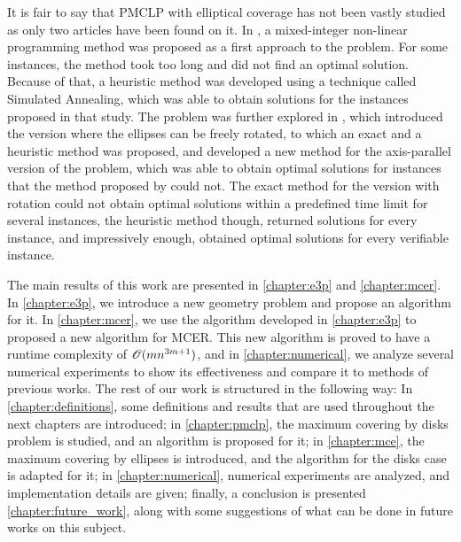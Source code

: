 It is fair to say that PMCLP with elliptical coverage has not been vastly studied as only two articles have been found on it. In , a mixed-integer non-linear programming method was proposed as a first approach to the problem. For some instances, the method took too long and did not find an optimal solution. Because of that, a heuristic method was developed using a technique called Simulated Annealing, which was able to obtain solutions for the instances proposed in that study.
The problem was further explored in , which introduced the version where the ellipses can be freely rotated, to which an exact and a heuristic method was proposed, and developed a new method for the axis-parallel version of the problem, which was able to obtain optimal solutions for instances that the method proposed by  could not.
The exact method for the version with rotation could not obtain optimal solutions within a predefined time limit for several instances, the heuristic method though, returned solutions for every instance, and impressively enough, obtained optimal solutions for every verifiable instance.


The main results of this work are presented in \autoref{chapter:e3p} and  \autoref{chapter:mcer}. 
In \autoref{chapter:e3p}, we introduce a new geometry problem and propose an algorithm for it.
In \autoref{chapter:mcer}, we use the algorithm developed in \autoref{chapter:e3p} to proposed a new algorithm for MCER. This new algorithm is proved to have a runtime complexity of $\mathscr{O}(mn^{3m+1})$, and in \autoref{chapter:numerical}, we analyze several numerical experiments to show its effectiveness and compare it to methods of previous works.
The rest of our work is structured in the following way: In \autoref{chapter:definitions}, some definitions and results that are used throughout the next chapters are introduced; in \autoref{chapter:pmclp}, the maximum covering by disks problem is studied, and an algorithm is proposed for it; in \autoref{chapter:mce}, the maximum covering by ellipses is introduced, and the algorithm for the disks case is adapted for it; in \autoref{chapter:numerical}, numerical experiments are analyzed, and implementation details are given; finally, a conclusion is presented \autoref{chapter:future_work}, along with some suggestions of what can be done in future works on this subject.